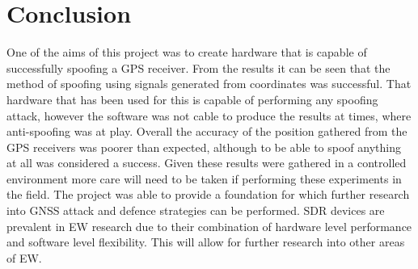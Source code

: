 
\chapter{Conclusion} %

\label{Chapter7} %

One of the aims of this project was to create hardware that is capable of successfully spoofing a GPS receiver. From the results it can be seen that the method of
spoofing using signals generated from coordinates was successful. That hardware that has been used for this is capable of performing any spoofing attack, however the
software was not cable to produce the results at times, where anti-spoofing was at play.
Overall the accuracy of the position gathered from the GPS receivers was poorer than expected, although
to be able to spoof anything at all was considered a success. Given these results were gathered in a controlled environment more care will need to be taken if
performing these experiments in the field. The project was able to provide a foundation for which further research into GNSS attack and defence strategies can be
performed. SDR devices are prevalent in EW research due to their combination of hardware level performance and software level flexibility. This will allow for further
research into other areas of EW.
